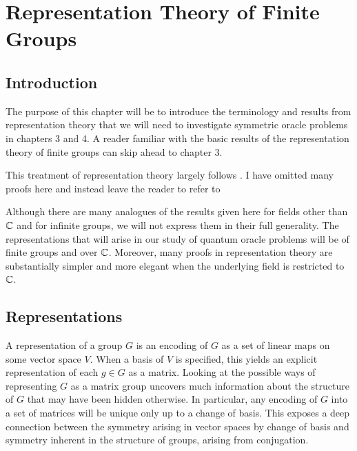 
\chapter{Representation Theory of Finite Groups}

\section{Introduction}



The purpose of this chapter will be to introduce the terminology and results from representation theory that we 
will need to investigate symmetric oracle problems in chapters 3 and 4. A reader familiar with the basic results of 
the representation theory of finite groups can skip ahead to chapter 3. 

This treatment of representation theory largely follows \cite{James&Liebeck}. I have omitted many proofs here and 
instead leave the reader to refer to \cite{James&Liebeck}

Although there are many analogues of the results given here for fields other than $\mathbb{C}$ and for infinite groups, we 
will not express them in their full generality. The representations that will arise in our study of quantum oracle 
problems will be of finite groups and over $\mathbb{C}$. Moreover, many proofs in representation theory are substantially 
simpler and more elegant when the underlying field is restricted to $\mathbb{C}$.

\section{Representations}

A representation of a group $G$ is an encoding of $G$ as a set of linear maps on some vector space $V$. When a 
basis of $V$ is specified, this yields an explicit representation of each $g \in G$ as a matrix. Looking at the 
possible ways of representing $G$ as a matrix group uncovers much information about the structure of $G$ that may 
have been hidden otherwise. In particular, any encoding of $G$ into a set of matrices will be unique only up to a 
change of basis. This exposes a deep connection between the symmetry arising in vector spaces by change of basis 
and symmetry inherent in the structure of groups, arising from conjugation.


